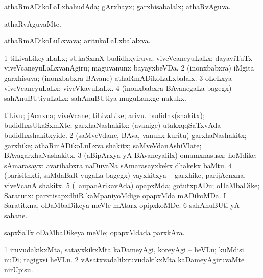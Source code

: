 \bentry
{} 
\gl{\gu}
\expl{}
\bmng
 athaRmADikoLaLxbahudAda; gArxhayx; garxhisabalalx; athaRvAguva. 
\emng
\eentry

\bentry
{} 
\gl{\kirxvi}
\expl{}
\bmng
athaRvAguvaMte. 
\emng
\eentry

\bentry
{} 
\gl{\nA}
\expl{}
\bmng
 athaRmADikoLuLxvava; aritukoLaLxbalalxva. 
\emng
\eentry

\bentry
{} 
\gl{\gu}
\expl{}
\bmng
\bnum
\num{1} tiLivaLikeyuLaLx; sUkaSxmX budidhxyiruva; viveVcaneyuLaLx:  dayaviTuTx viveVcaneyuLaLxvanAgiru; maguvanunx bayayxbeVDa. 
\num{2} (inonxbabxra) iMgita garxhisuva; (inonxbabxra BAvane) athaRmADikoLaLxbalalx. 
\num{3} oLeLxya viveVcaneyuLaLx; viveVkavuLaLx. 
\num{4} (inonxbabxra BAvanegaLa bagegx) sahAnuBUtiyuLaLx:  sahAnuBUtiya muguLanxge nakukx. 
\enum
\emng
\eentry

\bentry
{} 
\gl{\nA}
\expl{}
\bmng
\bnum
{} 
\banum
{} tiLivu; jAcnxna; viveVcane; tiLivaLike; arivu. 
 budidhx(shakitx); budidhxsUkaSxmXte; garxhaNashakitx:  (avanige) utakxqqSaTxvAda budidhxshakitxyide. 
\eanum
\numie
\num{2} (saMveVdane, BAva, \mo vanunx kuritu) garxhaNashakitx; garxhike; athaRmADikoLuLxva shakitx; saMveVdanAshiVlate; BAvagarxhaNashakitx. 
\num{3} (aBipArxya yA BAvaneyalilx) omamxnasusx; hoMdike; sAmarasayx:  avaribabxra naDuvaNa sAmarasayxkekx dhakekx baMtu. 
\num{4} (parisithxti, saMdaBaR \mo vugaLa bagegx) vayxkitxya -- garxhike, parijAcnxna, viveVcanA shakitx. 
\num{5} (\kanmu\ aupacArikavAda) opapxMda; gotutxpADu; oDaMbaDike; Saratutx:  parxtisapxdhiR kaMpaniyoMdige opapxMda mADikoMDa.  I Saratitxna, oDaMbaDikeya meVle mAtarx opipxkoMDe. 
\num{6} sahAnuBUti yA sahane. 
\enum
\emng

\noindent
\gl{\pagu}
\expl{}
\bmng
  sapxSaTx oDaMbaDikeya meVle; opapxMdada parxkAra. 
\emng
\eentry

\bentry
{} 
\gl{\sakirx}
\expl{}
\bmng
\bnum
\num{1} iruvudakikxMta, satayxkikxMta kaDameyAgi, koreyAgi -- heVLu; kuMdisi nuDi; tagigxsi heVLu. 
\num{2} vAsatxvadalilxruvudakikxMta kaDameyAgiruvaMte nirUpisu. 
\enum
\emng
\eentry

